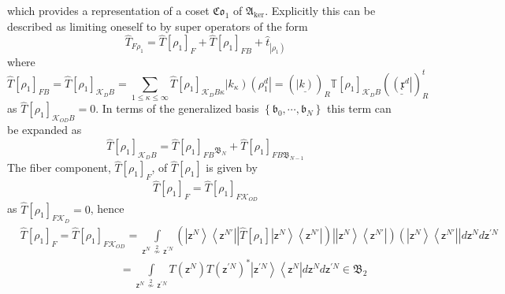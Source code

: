\documentclass[aps,preprint]{revtex4}%
\begin{document}
which provides a representation of a coset $\mathfrak{Co}_{1}$ of
$\mathfrak{A}_{\ker}$. Explicitly this can be described as limiting oneself to
by super operators of the form%
\begin{equation}
\hat{T}_{F\rho_{1}}=\hat{T}\left[  \rho_{1}\right]  _{F}+\hat{T}\left[
\rho_{1}\right]  _{FB}+\hat{t}_{\left\vert \rho_{1}\right)  }%
\end{equation}
where%
\begin{equation}
\hat{T}\left[  \rho_{1}\right]  _{FB}=\hat{T}\left[  \rho_{1}\right]
_{\mathcal{K}_{D}B}=%
{\displaystyle\sum\limits_{1\leq\kappa\leq\infty}}
\hat{T}\left[  \rho_{1}\right]  _{\mathcal{K}_{D}B\kappa}\left\vert k_{\kappa
}\right)  \left(  \mathfrak{\rho}_{1}^{d}\right\vert =\left(  \underline
{\left\vert k\right)  }\right)  _{R}\mathbb{T}\left[  \rho_{1}\right]
_{\mathcal{K}_{D}B}\left(  \underline{\left(  \mathfrak{x}^{d}\right\vert
}\right)  _{R}^{t}%
\end{equation}
as $\hat{T}\left[  \rho_{1}\right]  _{\mathcal{K}_{OD}B}=0$. In terms of the
generalized basis $\left\{  \mathfrak{b}_{0},\cdots,\mathfrak{b}_{N}\right\}
$ this term can be expanded as
\begin{equation}
\hat{T}\left[  \rho_{1}\right]  _{\mathcal{K}_{D}B}=\hat{T}\left[  \rho
_{1}\right]  _{FB}{}_{\mathfrak{B}_{N}}+\hat{T}\left[  \rho_{1}\right]
_{FB\mathfrak{B}_{N-1}}%
\end{equation}
The fiber component, $\hat{T}\left[  \rho_{1}\right]  _{F}$, of $\hat
{T}\left[  \rho_{1}\right]  $ is given by%
\begin{equation}
\hat{T}\left[  \rho_{1}\right]  _{F}=\hat{T}\left[  \rho_{1}\right]
_{F\mathcal{K}_{OD}}%
\end{equation}
as $\hat{T}\left[  \rho_{1}\right]  _{F\mathcal{K}_{D}}=0$, hence
\begin{align}
&  \hat{T}\left[  \rho_{1}\right]  _{F}=\hat{T}\left[  \rho_{1}\right]
_{F\mathcal{K}_{OD}}=%
{\displaystyle\int\limits_{\mathsf{z}^{N}\overset{2}{\,\nsim\,}\mathsf{z}%
^{\prime N}}}
\left(  \left\vert \mathsf{z}^{N}\right\rangle \left\langle \mathsf{z}%
^{N\prime}\right\vert \left\vert \hat{T}\left[  \rho_{1}\right]  \right.
\left\vert \mathsf{z}^{N}\right\rangle \left\langle \mathsf{z}^{N\prime
}\right\vert \right)  \left\vert \left\vert \mathsf{z}^{N}\right\rangle
\left\langle \mathsf{z}^{N\prime}\right\vert \right)  \left(  \left\vert
\mathsf{z}^{N}\right\rangle \left\langle \mathsf{z}^{N\prime}\right\vert
\right\vert d\mathsf{z}^{N}d\mathsf{z}^{\prime N}\nonumber\\
&  \qquad\qquad\qquad\qquad\quad\left.  =\right.
{\displaystyle\int\limits_{\mathsf{z}^{N}\overset{2}{\,\nsim\,}\mathsf{z}%
^{\prime N}}}
T\left(  \mathsf{z}^{N}\right)  T\left(  \mathsf{z}^{\prime N}\right)  ^{\ast
}\left\vert \mathsf{z}^{\prime N}\right\rangle \left\langle \mathsf{z}%
^{N}\right\vert d\mathsf{z}^{N}d\mathsf{z}^{\prime N}\in\mathfrak{B}_{2}%
\end{align}
\end{document}
